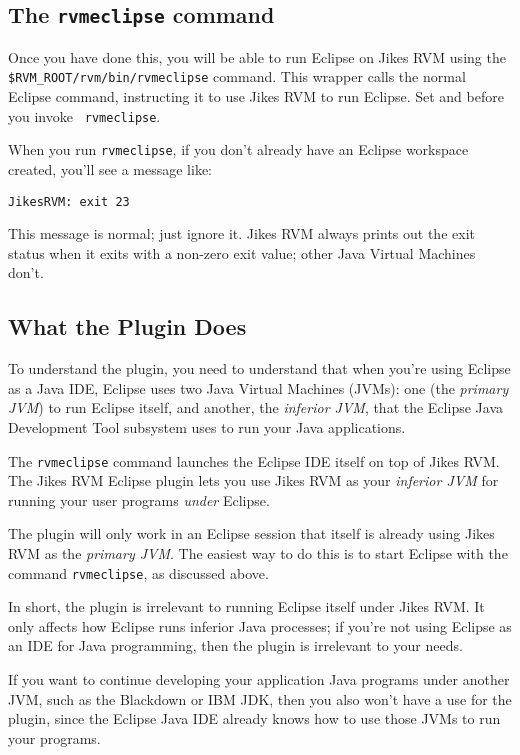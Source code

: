 \subsection{The {\tt rvmeclipse} command}

%
Once you have done this, you will be able to run Eclipse on Jikes RVM
using the {\tt \$RVM\_\-ROOT/\-rvm/\-bin/\-rvmeclipse} command.  This wrapper
calls the normal Eclipse command, instructing it to use Jikes RVM to
run Eclipse.  Set  and  before you invoke {\tt
rvmeclipse}.

When you run {\tt rvmeclipse}, if you don't already
have an Eclipse workspace created, you'll see a message like:
\begin{example}
{\tt JikesRVM: exit 23}
\end{example}
This message is normal; just ignore it.  Jikes RVM always prints out
the exit status when it exits with a non-zero exit value; other Java\TMweb{}
Virtual Machines don't.

\subsection{What the Plugin Does}

To understand the plugin, you need to understand that when you're
using Eclipse as a Java IDE, Eclipse uses two Java Virtual Machines
(JVMs): one (the {\em primary JVM}) to run Eclipse itself, and
another, the {\em inferior JVM}, that the Eclipse Java Development
Tool subsystem uses to run your Java applications.

The {\tt rvmeclipse} command launches the Eclipse IDE itself on top of
Jikes RVM.  The Jikes RVM Eclipse plugin lets you use Jikes RVM as
your {\em inferior JVM} for running your user programs {\em under} Eclipse.

The plugin will only work in an Eclipse session that itself is already
using Jikes RVM as the {\em primary JVM}.  The easiest way to do this
is to start Eclipse with the command {\tt rvmeclipse}, as discussed
above.

In short, the plugin is irrelevant to running Eclipse itself under
Jikes RVM.  It only affects how Eclipse runs inferior Java processes;
if you're not using Eclipse as an IDE for Java programming, then
the plugin is irrelevant to your needs.

If you want to continue developing your application Java programs
under another JVM, such as the Blackdown or IBM JDK, then you also
won't have a use for the plugin, since the Eclipse Java IDE already
knows how to use those JVMs to run your programs.


